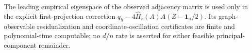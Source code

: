 The leading empirical eigenspace of the observed adjacency matrix is used only in the explicit first-projection correction \(q_h-4\widehat\Pi_r(A)A(Z-\mathbf1_n/2)\).  Its graph-observable residualization and coordinate-oscillation certificates are finite and polynomial-time computable; no \(d/n\) rate is asserted for either feasible principal-component remainder.